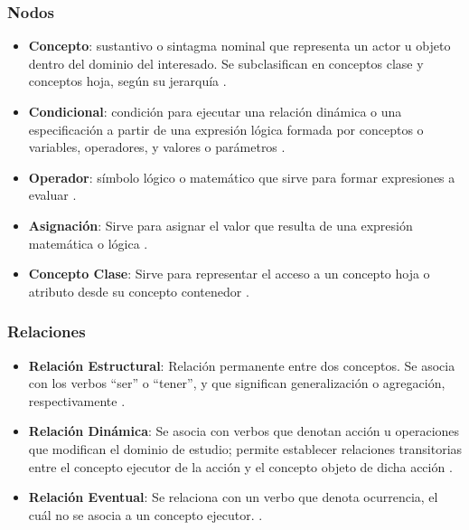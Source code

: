 \subsubsection{Nodos}
\begin{itemize}
	\item \textbf{Concepto}:
	sustantivo o sintagma nominal que representa un actor u objeto dentro del dominio del interesado. Se subclasifican en conceptos clase y conceptos hoja, según su jerarquía \citep{zapata2007phd,zapata2012unc}. %
	
	\item \textbf{Condicional}: condición para ejecutar una relación dinámica o una especificación a partir de una expresión lógica formada por conceptos o variables, operadores, y valores o parámetros \citep{zapata2007phd,zapata2012unc}. %
	
	\item \textbf{Operador}: símbolo lógico o matemático que sirve para formar expresiones a evaluar \citep{zapata2012unc}.
	
	\item \textbf{Asignación}: Sirve para asignar el valor que resulta de una expresión matemática o lógica \citep{zapata2012unc}.
	
	\item \textbf{Concepto Clase}: Sirve para representar el acceso a un concepto hoja o atributo desde su concepto contenedor \citep{zapata2007phd}.
\end{itemize}

\subsubsection{Relaciones}
\begin{itemize}
	\item \textbf{Relación Estructural}: Relación permanente entre dos conceptos. Se asocia con los verbos ``ser'' o ``tener'', y que significan generalización o agregación, respectivamente \citep{zapata2007phd,zapata2012unc}.
	\item \textbf{Relación Dinámica}: Se asocia con verbos que denotan acción u operaciones que modifican el dominio de estudio; permite establecer relaciones transitorias entre el concepto ejecutor de la acción y el concepto objeto de dicha acción \citep{zapata2007phd,zapata2012unc}.
	\item \textbf{Relación Eventual}: Se relaciona con un verbo que denota ocurrencia, el cuál no se asocia a un concepto ejecutor. \citep{zapata2012unc,norena2018Ling}.
\end{itemize}


